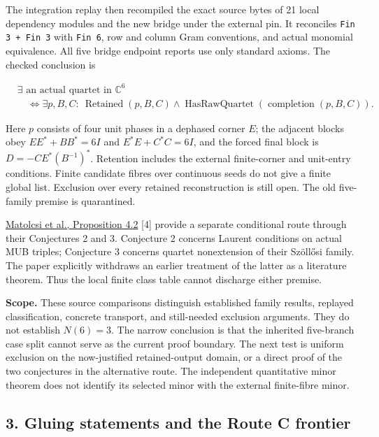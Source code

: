 \documentclass[
]{article}
\begin{document}
The integration replay then recompiled the exact source bytes of 21
local dependency modules and the new bridge under the external pin. It
reconciles \nolinkurl{Fin 3 + Fin 3} with \nolinkurl{Fin 6}, row and
column Gram conventions, and actual monomial equivalence. All five
bridge endpoint reports use only standard axioms. The checked conclusion
is

\[
\begin{aligned}
&\exists\text{ an actual quartet in }\mathbb C^6\\
&\quad\Longleftrightarrow
\exists p,B,C:\ \operatorname{Retained}(p,B,C)
\land\operatorname{HasRawQuartet}(\operatorname{completion}(p,B,C)).
\end{aligned}
\]

Here \(p\) consists of four unit phases in a dephased corner \(E\); the
adjacent blocks obey \(EE^*+BB^*=6I\) and \(E^*E+C^*C=6I\), and the
forced final block is \(D=-CE^*(B^{-1})^*\). Retention includes the
external finite-corner and unit-entry conditions. Finite candidate
fibres over continuous seeds do not give a finite global list. Exclusion
over every retained reconstruction is still open. The old five-family
premise is quarantined.

\href{https://doi.org/10.1007/s10801-026-01506-x}{Matolcsi et al.,
Proposition 4.2} {[}4{]} provide a separate conditional route through
their Conjectures 2 and 3. Conjecture 2 concerns Laurent conditions on
actual MUB triples; Conjecture 3 concerns quartet nonextension of their
Szöllősi family. The paper explicitly withdraws an earlier treatment of
the latter as a literature theorem. Thus the local finite class table
cannot discharge either premise.

\textbf{Scope.} These source comparisons distinguish established family
results, replayed classification, concrete transport, and still-needed
exclusion arguments. They do not establish \(N(6)=3\). The narrow
conclusion is that the inherited five-branch case split cannot serve as
the current proof boundary. The next test is uniform exclusion on the
now-justified retained-output domain, or a direct proof of the two
conjectures in the alternative route. The independent quantitative minor
theorem does not identify its selected minor with the external
finite-fibre minor.

\subsection{3. Gluing statements and the Route C
frontier}\label{gluing-statements-and-the-route-c-frontier}
\end{document}
